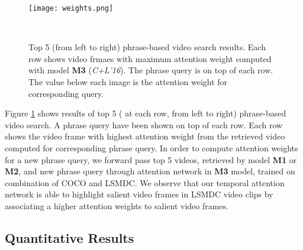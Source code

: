 \documentclass[runningheads]{llncs}
\begin{document}
\begin{figure}[ht]
\begin{center}
\texttt{[image: weights.png]} \\
\end{center}
\vspace{-0.2in}
 \caption{Top 5 (from left to right) phrase-based video search results. Each row shows video frmaes with maximum attention weight computed with model \textbf{M3} (\textit{C+L'16}). The phrase query is on top of each row. The value below each image is the attention weight for corresponding query.}
\label{overview}
\label{fig:equals}\
\vspace{-0.1in}
\end{figure}
\noindent
Figure \ref{fig:equals} shows results of top 5 ( at each row, from left to right) phrase-based video search. A phrase query have been shown on top of each row. Each row shows the video frame with highest attention weight from the retrieved video computed for corresponding phrase query. In order to compute attention weights for a new phrase query, we forward pass top 5 videos, retrieved by model \textbf{M1} or \textbf{M2}, and new phrase query through attention network in \textbf{M3} model, trained on combination of COCO and LSMDC. We observe that our temporal attention network is able to highlight salient video frames in LSMDC video clips by associating a higher attention weights to salient video frames.

\subsection{Quantitative Results}
\label{quantitative}
\end{document}
